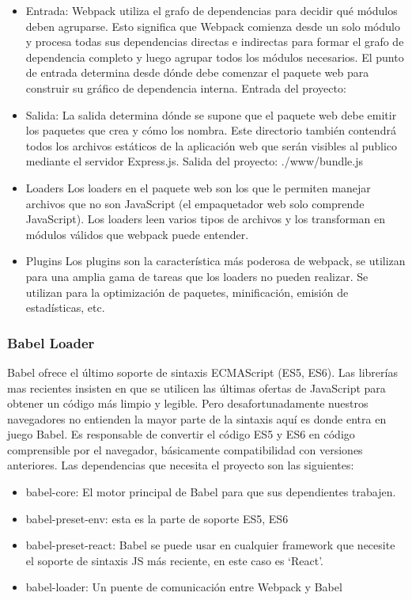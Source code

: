 \begin{itemize}
  \item Entrada:
  Webpack utiliza el grafo de dependencias para decidir qué módulos deben agruparse. Esto significa que Webpack comienza desde un solo módulo y procesa todas sus dependencias directas e indirectas para formar el grafo de dependencia completo y luego agrupar todos los módulos necesarios.
  El punto de entrada determina desde dónde debe comenzar el paquete web para construir su gráfico de dependencia interna.
  Entrada del proyecto: 
  \item Salida:
  La salida determina dónde se supone que el paquete web debe emitir los paquetes que crea y cómo los nombra. Este directorio también contendrá todos los archivos estáticos de la aplicación web que serán visibles al publico mediante el servidor Express.js.
  Salida del proyecto: ./www/bundle.js 
  \item Loaders
  Los loaders en el paquete web son los que le permiten manejar archivos que no son JavaScript (el empaquetador web solo comprende JavaScript). Los loaders leen varios tipos de archivos y los transforman en módulos válidos que webpack puede entender.
  \item Plugins
  Los plugins son la característica más poderosa de webpack, se utilizan para una amplia gama de tareas que los loaders no pueden realizar. Se utilizan  para la optimización de paquetes, minificación, emisión de estadísticas, etc.
\end{itemize}
\vspace{0.8cm}

\subsubsection{Babel Loader}
Babel ofrece el último soporte de sintaxis ECMAScript (ES5, ES6). Las librerías mas recientes insisten en que se utilicen las últimas ofertas de JavaScript para obtener un código más limpio y legible. Pero desafortunadamente nuestros navegadores no entienden la mayor parte de la sintaxis aquí es donde entra en juego Babel. Es responsable de convertir el código ES5 y ES6 en código comprensible por el navegador, básicamente compatibilidad con versiones anteriores. Las dependencias que necesita el proyecto son las siguientes:
\vspace{0.8cm}

\begin{itemize}
  \item babel-core: El motor principal de Babel para que sus dependientes trabajen.

  \item babel-preset-env: esta es la parte de soporte ES5, ES6

  \item babel-preset-react: Babel se puede usar en cualquier framework que necesite el soporte de sintaxis JS más reciente, en este caso es `React'.

  \item babel-loader: Un puente de comunicación entre Webpack y Babel
\end{itemize}
\vspace{0.8cm}


